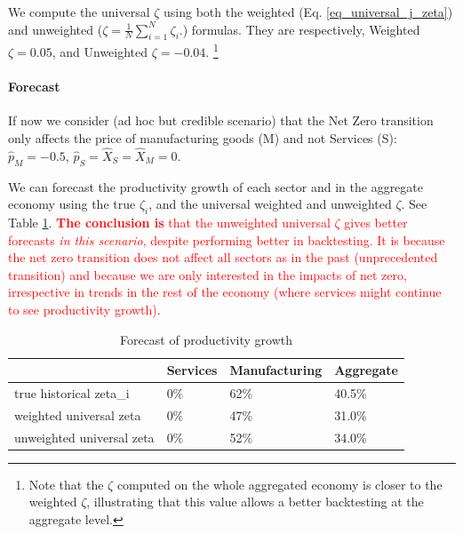\documentclass[11pt]{article}
\begin{document}
We compute the universal $\zeta$ using both the weighted (Eq. \ref{eq_universal_j_zeta}) and unweighted ($ \zeta = \frac{1}{N}\sum_{i=1}^N  \zeta_i.$) formulas. They are respectively, Weighted $\zeta=0.05$, and Unweighted  $\zeta=-0.04$.
\footnote{
 Note that the $\zeta$ computed on the whole aggregated economy is closer to the weighted $\zeta$, illustrating that this value allows a better backtesting at the aggregate level. }

\paragraph{Forecast} If now we consider (ad hoc but credible scenario) that the Net Zero transition only affects the price of manufacturing goods (M) and not Services (S): $\hat{p}_M=-0.5$, $\hat{p}_S=\hat{X}_S=\hat{X}_M=0$.

We can forecast the productivity growth of each sector and in the aggregate economy using the true $\zeta_i$, and the universal weighted and unweighted $\zeta$. See Table \ref{tab_forecast_aihat_adhoc_scenario}.
\textcolor{red}{\textbf{The conclusion is} that the unweighted universal $\zeta$ gives better forecasts \textit{in this scenario}, despite performing better in backtesting. It is because the net zero transition does not affect all sectors as in the past (unprecedented transition) and because we are only interested in the impacts of net zero, irrespective in trends in the rest of the economy (where services might continue to see productivity growth)}.

\begin{table}[H]
\centering
\caption{Forecast of productivity growth}
\label{tab_forecast_aihat_adhoc_scenario}
\begin{tabular}{@{}llll@{}}
\toprule
                          & Services & Manufacturing & Aggregate \\ \midrule
true historical zeta\_i     & 0\%      & 62\%          & 40.5\%    \\
weighted universal zeta   & 0\%      & 47\%          & 31.0\%    \\
unweighted universal zeta & 0\%      & 52\%          & 34.0\%    \\ \bottomrule
\end{tabular}
\end{table}
\end{document}
